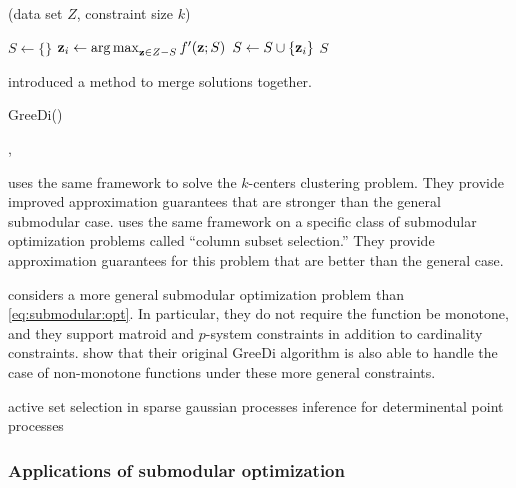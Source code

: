 \documentclass[thesis.tex]{subfiles}
\newcommand{\TO}{{\bfseries to}~}
\newcommand{\greedy}{\mkprocedure{greedy}}
\begin{document}
\begin{algorithm}
    \caption{\greedy(data set $Z$, constraint size $k$)}
    \label{alg:submodular:greedy}
    \vspace{0.1in}
    \begin{algorithmic}[1]
        \State $S \leftarrow \{\}$
        \For {$i = 1$ \TO $k$}
            \State $\mathbf z_i \leftarrow \operatorname*{arg\,max}_{\mathbf z\in Z-S} f'(\mathbf z;S)$
            \State $S \leftarrow S \cup \{\mathbf z_i\}$
        \EndFor
        \State \Return $S$
    \end{algorithmic}
\end{algorithm}

\cite{mirzasoleiman2013distributed} introduced a method to merge solutions together.

\begin{algorithm}
    \caption{GreeDi()}
    \vspace{0.1in}
    \begin{algorithmic}[1]
        \State
    \end{algorithmic}
\end{algorithm}

\cite{mirzasoleiman2015distributed},\citep{barbosa2015power} 

\cite{malkomes2015fast} uses the same framework to solve the $k$-centers clustering problem.
They provide improved approximation guarantees that are stronger than the general submodular case.
\cite{bhaskara2016greedy} uses the same framework on a specific class of submodular optimization problems called ``column subset selection.''
They provide approximation guarantees for this problem that are better than the general case.

\cite{barbosa2016new} considers a more general submodular optimization problem than \eqref{eq:submodular:opt}.
In particular, they do not require the function be monotone, and they support matroid and $p$-system constraints in addition to cardinality constraints.
\citet{mirzasoleiman2016distributed} show that their original GreeDi algorithm is also able to handle the case of non-monotone functions under these more general constraints.

active set selection in sparse gaussian processes 
inference for determinental point processes \citep{mirzasoleiman2016distributed}

\subsubsection{Applications of submodular optimization}
\end{document}
